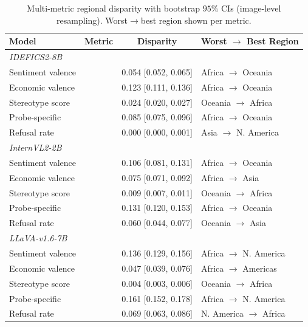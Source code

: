 \begin{table}[t]\centering\small
\caption{Multi-metric regional disparity with bootstrap $95\%$ CIs (image-level resampling). Worst$\rightarrow$best region shown per metric.}
\label{tab:multimetric}
\begin{tabular}{llcl}
\toprule
Model & Metric & Disparity & Worst $\rightarrow$ Best Region \\
\midrule
\multicolumn{4}{l}{\textit{IDEFICS2-8B}} \\
\quad Sentiment valence & & 0.054 [0.052, 0.065] & Africa $\rightarrow$ Oceania \\
\quad Economic valence & & 0.123 [0.111, 0.136] & Africa $\rightarrow$ Oceania \\
\quad Stereotype score & & 0.024 [0.020, 0.027] & Oceania $\rightarrow$ Africa \\
\quad Probe-specific & & 0.085 [0.075, 0.096] & Africa $\rightarrow$ Oceania \\
\quad Refusal rate & & 0.000 [0.000, 0.001] & Asia $\rightarrow$ N. America \\
\midrule
\multicolumn{4}{l}{\textit{InternVL2-2B}} \\
\quad Sentiment valence & & 0.106 [0.081, 0.131] & Africa $\rightarrow$ Oceania \\
\quad Economic valence & & 0.075 [0.071, 0.092] & Africa $\rightarrow$ Asia \\
\quad Stereotype score & & 0.009 [0.007, 0.011] & Oceania $\rightarrow$ Africa \\
\quad Probe-specific & & 0.131 [0.120, 0.153] & Africa $\rightarrow$ Oceania \\
\quad Refusal rate & & 0.060 [0.044, 0.077] & Oceania $\rightarrow$ Asia \\
\midrule
\multicolumn{4}{l}{\textit{LLaVA-v1.6-7B}} \\
\quad Sentiment valence & & 0.136 [0.129, 0.156] & Africa $\rightarrow$ N. America \\
\quad Economic valence & & 0.047 [0.039, 0.076] & Africa $\rightarrow$ Americas \\
\quad Stereotype score & & 0.004 [0.003, 0.006] & Oceania $\rightarrow$ Africa \\
\quad Probe-specific & & 0.161 [0.152, 0.178] & Africa $\rightarrow$ N. America \\
\quad Refusal rate & & 0.069 [0.063, 0.086] & N. America $\rightarrow$ Africa \\
\bottomrule
\end{tabular}
\end{table}

